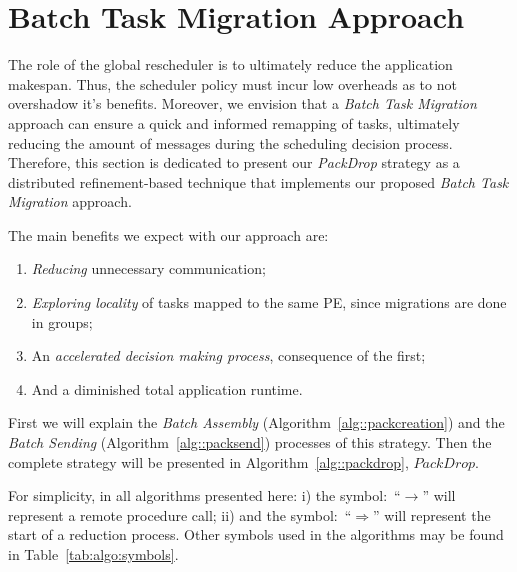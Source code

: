 \section{Batch Task Migration Approach} \label{sec:algo}


The role of the global rescheduler is to ultimately reduce the application makespan. 
Thus, the scheduler policy must incur low overheads as to not overshadow it's benefits. 
Moreover, we envision that a \textit{Batch Task Migration} approach can ensure a quick and informed remapping of tasks, ultimately reducing the amount of messages during the scheduling decision process. 
Therefore, this section is dedicated to present our \textit{PackDrop} strategy as a distributed refinement-based technique that implements our proposed \textit{Batch Task Migration} approach.

The main benefits we expect with our approach are: 
\begin{enumerate}
	\item \textit{Reducing} unnecessary communication;
	\item \textit{Exploring locality} of tasks mapped to the same PE, since migrations are done in groups;
	\item An \textit{accelerated decision making process}, consequence of the first;
	\item And a diminished total application runtime.
\end{enumerate}

First we will explain the \textit{Batch Assembly} (Algorithm~\ref{alg::packcreation}) and the \textit{Batch Sending} (Algorithm~\ref{alg::packsend}) processes of this strategy.
Then the complete strategy will be presented in Algorithm~\ref{alg::packdrop}, $PackDrop$.

For simplicity, in all algorithms presented here: i) the symbol:~``$\rightarrow$'' will represent a remote procedure call; ii) and the symbol:~``$\Rightarrow$'' will  represent the start of a reduction process.
Other symbols used in the algorithms may be found in Table~\ref{tab:algo:symbols}.

